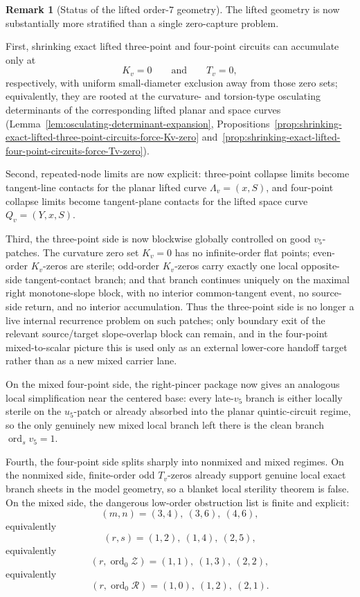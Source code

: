 \documentclass[11pt,a4paper]{amsart}
\theoremstyle{plain}
\theoremstyle{definition}
\newtheorem{remark}[theorem]{Remark}
\begin{document}
\begin{remark}[Status of the lifted order-$7$ geometry]
\label{rem:wip-lifted-order7-zero-capture}
The lifted geometry is now substantially more stratified than a single
zero-capture problem.

First, shrinking exact lifted three-point and four-point circuits can accumulate
only at
\[
K_v=0
\qquad\text{and}\qquad
T_v=0,
\]
respectively, with uniform small-diameter exclusion away from those zero sets;
equivalently, they are rooted at the curvature- and torsion-type osculating
determinants of the corresponding lifted planar and space curves
(Lemma~\ref{lem:osculating-determinant-expansion},
Propositions~\ref{prop:shrinking-exact-lifted-three-point-circuits-force-Kv-zero}
and~\ref{prop:shrinking-exact-lifted-four-point-circuits-force-Tv-zero}).

Second, repeated-node limits are now explicit:
three-point collapse limits become tangent-line contacts for the
planar lifted curve $\Lambda_v=(x,S)$, and four-point collapse limits become
tangent-plane contacts for the lifted space curve $Q_v=(Y,x,S)$.

Third, the three-point side is now blockwise globally controlled on good
$v_5$-patches.
The curvature zero set $K_v=0$ has no infinite-order flat points; even-order
$K_v$-zeros are sterile; odd-order $K_v$-zeros carry exactly one local
opposite-side tangent-contact branch; and that branch continues uniquely on the
maximal right monotone-slope block, with no interior common-tangent event, no
source-side return, and no interior accumulation. Thus the three-point side is
no longer a live internal recurrence problem on such
patches; only boundary exit of the relevant source/target slope-overlap block
can remain, and in the four-point mixed-to-scalar picture this is used only as
an external lower-core handoff target rather than as a new mixed carrier lane.

On the mixed four-point side, the right-pincer package now gives an analogous
local simplification near the centered base: every late-$v_5$ branch is either
locally sterile on the $u_5$-patch or already absorbed into the planar
quintic-circuit regime, so the only genuinely new mixed local branch left there
is the clean branch $\operatorname{ord}_s v_5=1$.

Fourth, the four-point side splits sharply into nonmixed and mixed regimes.
On the nonmixed side, finite-order odd $T_v$-zeros already support genuine
local exact branch sheets in the model geometry, so a blanket local sterility
theorem is false. On the mixed side, the dangerous low-order obstruction list is
finite and explicit:
\[
(m,n)=(3,4),\ (3,6),\ (4,6),
\]
equivalently
\[
(r,s)=(1,2),\ (1,4),\ (2,5),
\]
equivalently
\[
(r,\operatorname{ord}_0\mathcal Z)=(1,1),\ (1,3),\ (2,2),
\]
equivalently
\[
(r,\operatorname{ord}_0\mathcal R)=(1,0),\ (1,2),\ (2,1).
\]


\end{remark}
\end{document}
